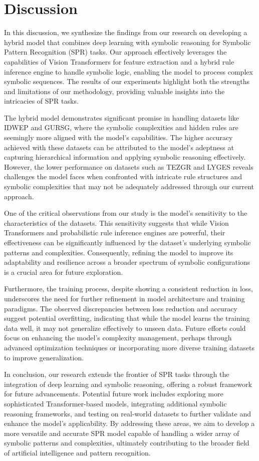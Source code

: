 \documentclass{article}
\begin{document}
\section{Discussion}
In this discussion, we synthesize the findings from our research on developing a hybrid model that combines deep learning with symbolic reasoning for Symbolic Pattern Recognition (SPR) tasks. Our approach effectively leverages the capabilities of Vision Transformers for feature extraction and a hybrid rule inference engine to handle symbolic logic, enabling the model to process complex symbolic sequences. The results of our experiments highlight both the strengths and limitations of our methodology, providing valuable insights into the intricacies of SPR tasks.

The hybrid model demonstrates significant promise in handling datasets like IDWEP and GURSG, where the symbolic complexities and hidden rules are seemingly more aligned with the model's capabilities. The higher accuracy achieved with these datasets can be attributed to the model’s adeptness at capturing hierarchical information and applying symbolic reasoning effectively. However, the lower performance on datasets such as TEZGR and LYGES reveals challenges the model faces when confronted with intricate rule structures and symbolic complexities that may not be adequately addressed through our current approach.

One of the critical observations from our study is the model's sensitivity to the characteristics of the datasets. This sensitivity suggests that while Vision Transformers and probabilistic rule inference engines are powerful, their effectiveness can be significantly influenced by the dataset's underlying symbolic patterns and complexities. Consequently, refining the model to improve its adaptability and resilience across a broader spectrum of symbolic configurations is a crucial area for future exploration.

Furthermore, the training process, despite showing a consistent reduction in loss, underscores the need for further refinement in model architecture and training paradigms. The observed discrepancies between loss reduction and accuracy suggest potential overfitting, indicating that while the model learns the training data well, it may not generalize effectively to unseen data. Future efforts could focus on enhancing the model's complexity management, perhaps through advanced optimization techniques or incorporating more diverse training datasets to improve generalization.

In conclusion, our research extends the frontier of SPR tasks through the integration of deep learning and symbolic reasoning, offering a robust framework for future advancements. Potential future work includes exploring more sophisticated Transformer-based models, integrating additional symbolic reasoning frameworks, and testing on real-world datasets to further validate and enhance the model's applicability. By addressing these areas, we aim to develop a more versatile and accurate SPR model capable of handling a wider array of symbolic patterns and complexities, ultimately contributing to the broader field of artificial intelligence and pattern recognition.
\end{document}
